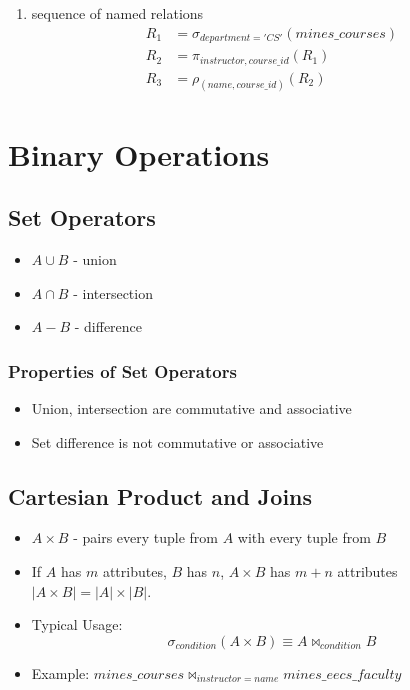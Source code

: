 \documentclass{../cheatsheet}
\begin{document}
\begin{multicols*}{2}
\begin{enumerate}
        \item sequence of named relations
            \begin{align*}
                R_1 &= \sigma_{department='CS'}(mines\_courses)\\
                R_2 &= \pi_{instructor, course\_id}(R_1)\\
                R_3 &= \rho_{(name, course\_id)}(R_2)
            \end{align*}
    \end{enumerate}

    \section{Binary Operations}
    \subsection{Set Operators}
    \begin{itemize}
        \item $A \cup B$ - union
        \item $A \cap B$ - intersection
        \item $A - B$ - difference
    \end{itemize}

    \subsubsection{Properties of Set Operators}
    \begin{itemize}
        \item Union, intersection are commutative and associative
        \item Set difference is not commutative or associative
    \end{itemize}

    \subsection{Cartesian Product and Joins}
    \begin{itemize}
        \item $A \times B$ - pairs every tuple from $A$ with every tuple from $B$
        \item If $A$ has $m$ attributes, $B$ has $n$, $A \times B$ has $m + n$
            attributes $|A \times B| = |A| \times |B|$.
        \item Typical Usage:
            \[\sigma_{condition}(A \times B) \equiv A \bowtie_{condition} B\]
        \item Example: \(mines\_courses \bowtie_{instructor = name}
            mines\_eecs\_faculty\)
    \end{itemize}


\end{multicols*}
\end{document}

